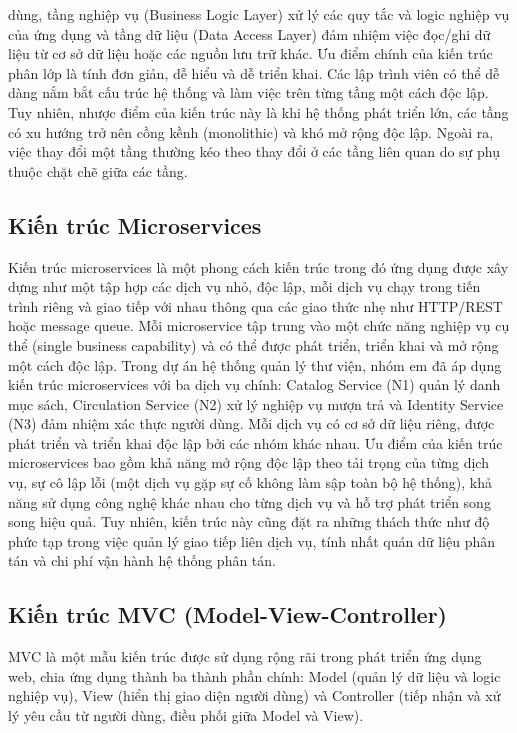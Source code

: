 dùng, tầng nghiệp vụ (Business Logic Layer) xử lý các quy tắc và logic nghiệp vụ của ứng dụng và tầng dữ liệu (Data Access Layer) đảm nhiệm việc đọc/ghi dữ liệu từ cơ sở dữ liệu hoặc các nguồn lưu trữ khác. Ưu điểm chính của kiến trúc phân lớp là tính đơn giản, dễ hiểu và dễ triển khai. Các lập trình viên có thể dễ dàng nắm bắt cấu trúc hệ thống và làm việc trên từng tầng một cách độc lập. Tuy nhiên, nhược điểm của kiến trúc này là khi hệ thống phát triển lớn, các tầng có xu hướng trở nên cồng kềnh (monolithic) và khó mở rộng độc lập. Ngoài ra, việc thay đổi một tầng thường kéo theo thay đổi ở các tầng liên quan do sự phụ thuộc chặt chẽ giữa các tầng.

\subsection{Kiến trúc Microservices}

Kiến trúc microservices là một phong cách kiến trúc trong đó ứng dụng được xây dựng như một tập hợp các dịch vụ nhỏ, độc lập, mỗi dịch vụ chạy trong tiến trình riêng và giao tiếp với nhau thông qua các giao thức nhẹ như HTTP/REST hoặc message queue. Mỗi microservice tập trung vào một chức năng nghiệp vụ cụ thể (single business capability) và có thể được phát triển, triển khai và mở rộng một cách độc lập. Trong dự án hệ thống quản lý thư viện, nhóm em đã áp dụng kiến trúc microservices với ba dịch vụ chính: Catalog Service (N1) quản lý danh mục sách, Circulation Service (N2) xử lý nghiệp vụ mượn trả và Identity Service (N3) đảm nhiệm xác thực người dùng. Mỗi dịch vụ có cơ sở dữ liệu riêng, được phát triển và triển khai độc lập bởi các nhóm khác nhau. Ưu điểm của kiến trúc microservices bao gồm khả năng mở rộng độc lập theo tải trọng của từng dịch vụ, sự cô lập lỗi (một dịch vụ gặp sự cố không làm sập toàn bộ hệ thống), khả năng sử dụng công nghệ khác nhau cho từng dịch vụ và hỗ trợ phát triển song song hiệu quả. Tuy nhiên, kiến trúc này cũng đặt ra những thách thức như độ phức tạp trong việc quản lý giao tiếp liên dịch vụ, tính nhất quán dữ liệu phân tán và chi phí vận hành hệ thống phân tán.

\subsection{Kiến trúc MVC (Model-View-Controller)}

MVC là một mẫu kiến trúc được sử dụng rộng rãi trong phát triển ứng dụng web, chia ứng dụng thành ba thành phần chính: Model (quản lý dữ liệu và logic nghiệp vụ), View (hiển thị giao diện người dùng) và Controller (tiếp nhận và xử lý yêu cầu từ người dùng, điều phối giữa Model và View).

